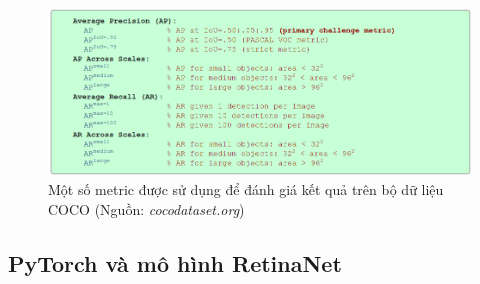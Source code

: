 \documentclass[a4paper, 12pt]{report}
\begin{document}
\begin{figure}[!h]
	\centering
	\includegraphics[width=1\linewidth]{Images/cocometric}
	\caption{Một số metric được sử dụng để đánh giá kết quả trên bộ dữ liệu COCO (Nguồn: \textit{cocodataset.org})}
	\label{fig:cocometric}
\end{figure}

\subsection{PyTorch và mô hình RetinaNet}
\end{document}
